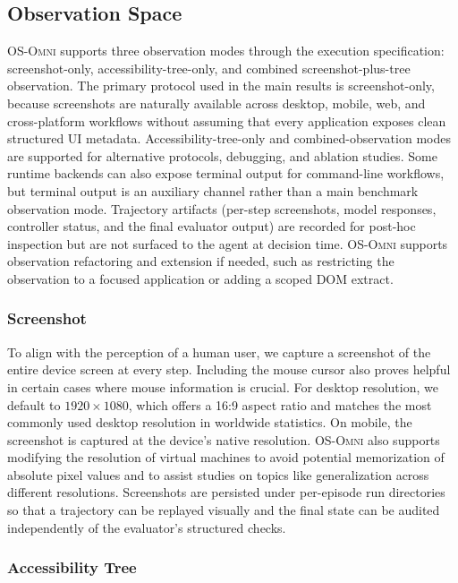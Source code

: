 \subsection{Observation Space}
\label{app:osomni_obs}

\textsc{OS-Omni} supports three observation modes through the execution specification: screenshot-only, accessibility-tree-only, and combined screenshot-plus-tree observation. The primary protocol used in the main results is screenshot-only, because screenshots are naturally available across desktop, mobile, web, and cross-platform workflows without assuming that every application exposes clean structured UI metadata. Accessibility-tree-only and combined-observation modes are supported for alternative protocols, debugging, and ablation studies. Some runtime backends can also expose terminal output for command-line workflows, but terminal output is an auxiliary channel rather than a main benchmark observation mode. Trajectory artifacts (per-step screenshots, model responses, controller status, and the final evaluator output) are recorded for post-hoc inspection but are not surfaced to the agent at decision time. \textsc{OS-Omni} supports observation refactoring and extension if needed, such as restricting the observation to a focused application or adding a scoped DOM extract.

\subsubsection{Screenshot}
\label{app:osomni_screenshot}

To align with the perception of a human user, we capture a screenshot of the entire device screen at every step. Including the mouse cursor also proves helpful in certain cases where mouse information is crucial. For desktop resolution, we default to $1920 \times 1080$, which offers a 16:9 aspect ratio and matches the most commonly used desktop resolution in worldwide statistics. On mobile, the screenshot is captured at the device's native resolution. \textsc{OS-Omni} also supports modifying the resolution of virtual machines to avoid potential memorization of absolute pixel values and to assist studies on topics like generalization across different resolutions. Screenshots are persisted under per-episode run directories so that a trajectory can be replayed visually and the final state can be audited independently of the evaluator's structured checks.

\subsubsection{Accessibility Tree}
\label{app:osomni_a11y}

